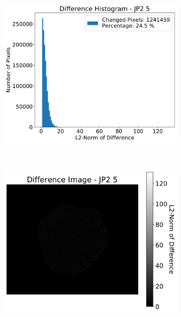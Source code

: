 \begin{figure}[htb]
\begin{subfigure}[b]{0.48\textwidth}
        \includegraphics[width=\textwidth]{doc/thesis/0_figures/compare_quality/set1/jp2_5_diff_histogram}
        \caption{}
        \label{fig:img_quality_comp_jp2_5_histo}
    \end{subfigure}
    \\
    \begin{subfigure}[b]{0.48\textwidth}
        \centering
        \includegraphics[width=\textwidth]{doc/thesis/0_figures/compare_quality/set1/jp2_5_diff_heatmap}
        \caption{}
        \label{fig:img_quality_comp_jp2_5_diff}
    \end{subfigure}

\end{figure}
